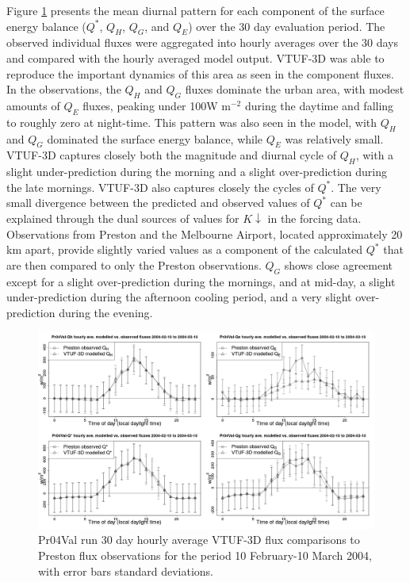 \documentclass[final,3p,times,authoryear]{elsarticle}
\begin{document}
Figure \ref{fig:Preston30Day4} presents the mean diurnal pattern for each component of the surface energy balance ($Q^{*}$, $Q_{H}$, $Q_{G}$, and $Q_{E}$)  over the 30 day evaluation period. The observed individual fluxes were aggregated into hourly averages over the 30 days and compared with the hourly averaged model output. VTUF-3D was able to reproduce the important dynamics of this area as seen in the component fluxes. In the observations, the $Q_{H}$ and $Q_{G}$ fluxes dominate the urban area, with modest amounts of $Q_{E}$ fluxes, peaking under 100W m$^{-2}$ during the daytime and falling to roughly zero at night-time. This pattern was also seen in the model, with $Q_{H}$ and $Q_{G}$ dominated the surface energy balance, while $Q_{E}$ was relatively small. VTUF-3D captures closely both the magnitude and diurnal cycle of $Q_{H}$, with a slight under-prediction during the morning and a slight over-prediction during the late mornings. VTUF-3D also captures closely the cycles of $Q^{*}$. The very small divergence between the predicted and observed values of $Q^{*}$ can be explained through the dual sources of values for $K\downarrow$ in the forcing data. Observations from Preston and the Melbourne Airport, located approximately 20 km apart, provide slightly varied values as a component of the calculated $Q^{*}$ that are then compared to only the Preston observations. $Q_{G}$ shows close agreement except for a slight over-prediction during the mornings, and at mid-day, a slight under-prediction during the afternoon cooling period, and a very slight over-prediction during the evening. 



\begin{figure}[!htbp] 
\includegraphics[trim = 0mm 0mm 0mm 0mm, clip, scale=0.30]{images/Pr04Val-EnergyBalanceOverallAve4Plots_.png}
\caption{Pr04Val run 30 day hourly average VTUF-3D flux comparisons to Preston flux observations for the period 10 February-10 March 2004, with error bars standard deviations. \label{fig:Preston30Day4} }     
\end{figure}
\end{document}
